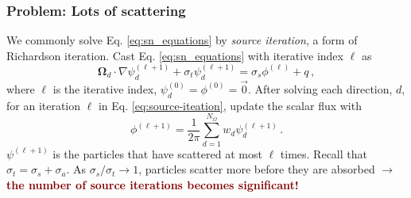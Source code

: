 \documentclass[xcolor={usenames,dvipsnames,svgnames,table}]{beamer}
\newcommand{\vo}{\pmb{\Omega}} %
\begin{document}
\begin{frame}\frametitle{Problem: Lots of scattering}
	We commonly solve Eq. \eqref{eq:sn_equations} by \textit{source iteration}, a form of Richardson iteration. Cast Eq. \eqref{eq:sn_equations} with iterative index $\ell$ as
	\begin{equation}
		\label{eq:source-iteation}
		\vo_d \cdot \nabla \psi_d^{(\ell + 1)} + \sigma_t \psi_d^{(\ell + 1)} = \sigma_s \phi^{(\ell)} + q\,,
	\end{equation}
	where $\ell$ is the iterative index, $\psi_d^{(0)} = \phi^{(0)} = \vec{0}$. After solving each direction, $d$, for an iteration $\ell$ in Eq. \eqref{eq:source-iteation}, update the scalar flux with
	\[
		\phi^{(\ell + 1)} = \frac{1}{2\pi} \sum_{d = 1}^{N_\Omega} w_d \psi_d^{(\ell + 1)}\,.
	\]
	$\psi^{(\ell + 1)}$ is the particles that have scattered at most $\ell$ times. Recall that $\sigma_t = \sigma_s + \sigma_a$. As $\sigma_s / \sigma_t \to 1$, particles scatter more before they are absorbed $\rightarrow$ \textbf{\textcolor{Maroon}{the number of source iterations becomes significant!}}
\end{frame}
\end{document}
